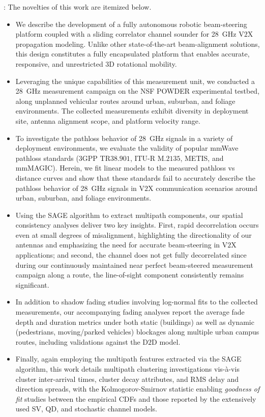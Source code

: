 \documentclass[10pt, twocolumn]{IEEEtran}
\begin{document}
: The novelties of this work are itemized below.
\begin{itemize}[leftmargin=*]
    \item We describe the development of a fully autonomous robotic beam-steering platform coupled with a sliding correlator channel sounder for \SI{28}{\giga\hertz} V$2$X propagation modeling. Unlike other state-of-the-art beam-alignment solutions, this design constitutes a fully encapsulated platform that enables accurate, responsive, and unrestricted $3$D rotational mobility.
    \item Leveraging the unique capabilities of this measurement unit, we conducted a \SI{28}{\giga\hertz} measurement campaign on the NSF POWDER experimental testbed, along unplanned vehicular routes around urban, suburban, and foliage environments. The collected measurements exhibit diversity in deployment site, antenna alignment scope, and platform velocity range.
    \item To investigate the pathloss behavior of \SI{28}{\giga\hertz} signals in a variety of deployment environments, we evaluate the validity of popular mmWave pathloss standards ($3$GPP TR$38.901$, ITU-R M$.2135$, METIS, and mmMAGIC). Herein, we fit linear models to the measured pathloss vs distance curves and show that these standards fail to accurately describe the pathloss behavior of \SI{28}{\giga\hertz} signals in V$2$X communication scenarios around urban, suburban, and foliage environments.
    \item Using the SAGE algorithm to extract multipath components, our spatial consistency analyses deliver two key insights. First, rapid decorrelation occurs even at small degrees of misalignment, highlighting the directionality of our antennas and emphasizing the need for accurate beam-steering in V$2$X applications; and second, the channel does not get fully decorrelated since during our continuously maintained near perfect beam-steered measurement campaign along a route, the line-of-sight component consistently remains significant.
    \item In addition to shadow fading studies involving log-normal fits to the collected measurements, our accompanying fading analyses report the average fade depth and duration metrics under both static (buildings) as well as dynamic (pedestrians, moving/parked vehicles) blockages along multiple urban campus routes, including validations against the D$2$D model.
    \item Finally, again employing the multipath features extracted via the SAGE algorithm, this work details multipath clustering investigations vis-\`{a}-vis cluster inter-arrival times, cluster decay attributes, and RMS delay and direction spreads, with the Kolmogorov-Smirnov statistic enabling \emph{goodness of fit} studies between the empirical CDFs and those reported by the extensively used SV, QD, and stochastic channel models.
\end{itemize}
\end{document}
